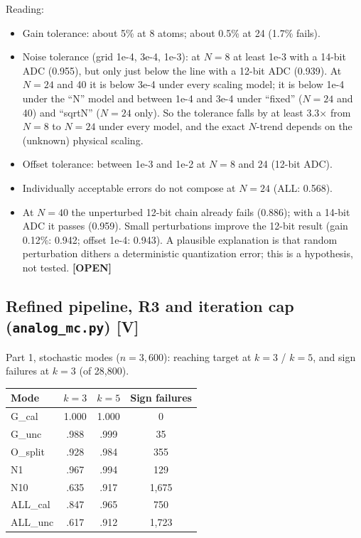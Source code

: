 \documentclass[11pt]{article}
\newcommand{\x}{$\times$}
\newcommand{\OPEN}{\textbf{[OPEN]}}
\newcommand{\scr}[1]{\texttt{#1}}
\begin{document}
Reading:
\begin{itemize}
  \item Gain tolerance: about 5\% at 8 atoms; about 0.5\% at 24 (1.7\% fails).
  \item Noise tolerance (grid 1e-4, 3e-4, 1e-3): at $N = 8$ at least 1e-3 with a 14-bit ADC (0.955), but only just below the line with a 12-bit ADC (0.939). At $N = 24$ and 40 it is below 3e-4 under every scaling model; it is below 1e-4 under the ``N'' model and between 1e-4 and 3e-4 under ``fixed'' ($N = 24$ and 40) and ``sqrtN'' ($N = 24$ only). So the tolerance falls by at least 3.3\x{} from $N = 8$ to $N = 24$ under every model, and the exact $N$-trend depends on the (unknown) physical scaling.
  \item Offset tolerance: between 1e-3 and 1e-2 at $N = 8$ and 24 (12-bit ADC).
  \item Individually acceptable errors do not compose at $N = 24$ (ALL: 0.568).
  \item At $N = 40$ the unperturbed 12-bit chain already fails (0.886); with a 14-bit ADC it passes (0.959). Small perturbations improve the 12-bit result (gain 0.12\%: 0.942; offset 1e-4: 0.943). A plausible explanation is that random perturbation dithers a deterministic quantization error; this is a hypothesis, not tested. \OPEN
\end{itemize}

\subsection{Refined pipeline, R3 and iteration cap (\scr{analog\_mc.py}) [V]}

Part 1, stochastic modes ($n = 3{,}600$): reaching target at $k = 3$ / $k = 5$, and sign failures at $k = 3$ (of 28,800).

\begin{center}
\begin{tabular}{lccc}
\toprule
Mode & $k=3$ & $k=5$ & Sign failures \\
\midrule
G\_cal & 1.000 & 1.000 & 0 \\
G\_unc & .988 & .999 & 35 \\
O\_split & .928 & .984 & 355 \\
N1 & .967 & .994 & 129 \\
N10 & .635 & .917 & 1,675 \\
ALL\_cal & .847 & .965 & 750 \\
ALL\_unc & .617 & .912 & 1,723 \\
\bottomrule
\end{tabular}
\end{center}
\end{document}
